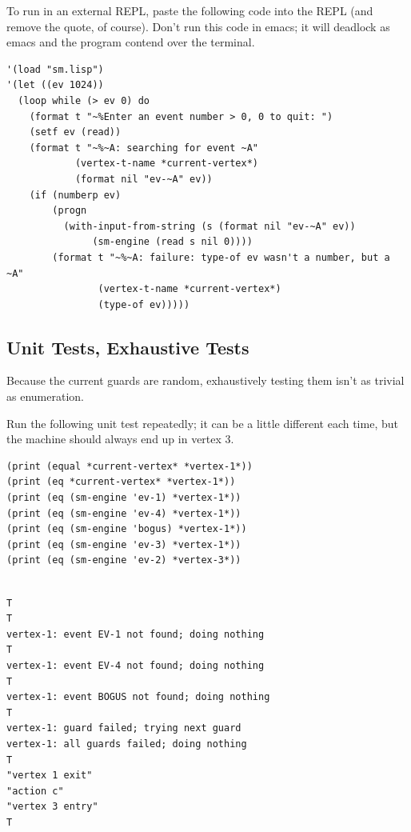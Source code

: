 \documentclass[10pt,oneside,x11names]{article}
\begin{document}
To run in an external REPL, paste the following code into the REPL (and
remove the quote, of course). Don't run this code in emacs; it will deadlock
as emacs and the program contend over the terminal.

\begin{verbatim}
'(load "sm.lisp")
'(let ((ev 1024))
  (loop while (> ev 0) do
    (format t "~%Enter an event number > 0, 0 to quit: ")
    (setf ev (read))
    (format t "~%~A: searching for event ~A"
            (vertex-t-name *current-vertex*)
            (format nil "ev-~A" ev))
    (if (numberp ev)
        (progn
          (with-input-from-string (s (format nil "ev-~A" ev))
               (sm-engine (read s nil 0))))
        (format t "~%~A: failure: type-of ev wasn't a number, but a ~A"
                (vertex-t-name *current-vertex*)
                (type-of ev)))))

\end{verbatim}

\subsection{Unit Tests, Exhaustive Tests}
\label{sec:org0f85a34}

Because the current guards are random, exhaustively testing them isn't as
trivial as enumeration.

Run the following unit test repeatedly; it can be a little different each
time, but the machine should always end up in vertex 3.

\begin{verbatim}
(print (equal *current-vertex* *vertex-1*))
(print (eq *current-vertex* *vertex-1*))
(print (eq (sm-engine 'ev-1) *vertex-1*))
(print (eq (sm-engine 'ev-4) *vertex-1*))
(print (eq (sm-engine 'bogus) *vertex-1*))
(print (eq (sm-engine 'ev-3) *vertex-1*))
(print (eq (sm-engine 'ev-2) *vertex-3*))
\end{verbatim}

\begin{verbatim}

T
T
vertex-1: event EV-1 not found; doing nothing
T
vertex-1: event EV-4 not found; doing nothing
T
vertex-1: event BOGUS not found; doing nothing
T
vertex-1: guard failed; trying next guard
vertex-1: all guards failed; doing nothing
T
"vertex 1 exit"
"action c"
"vertex 3 entry"
T
\end{verbatim}
\end{document}

